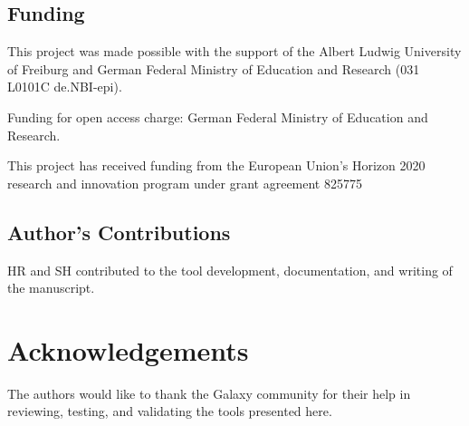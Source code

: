 \subsection*{Funding}
This project was made possible with the support of the Albert Ludwig University of Freiburg and German Federal Ministry of Education and Research (031 L0101C de.NBI-epi).

Funding for open access charge: German Federal Ministry of Education and Research.

This project has received funding from the European Union’s Horizon 2020 research and innovation program under grant agreement 825775

\subsection*{Author's Contributions}

HR and SH contributed to the tool development, documentation, and writing of the manuscript.

\section*{Acknowledgements}

The authors would like to thank the Galaxy community for their help in reviewing, testing, and validating the tools presented here.



